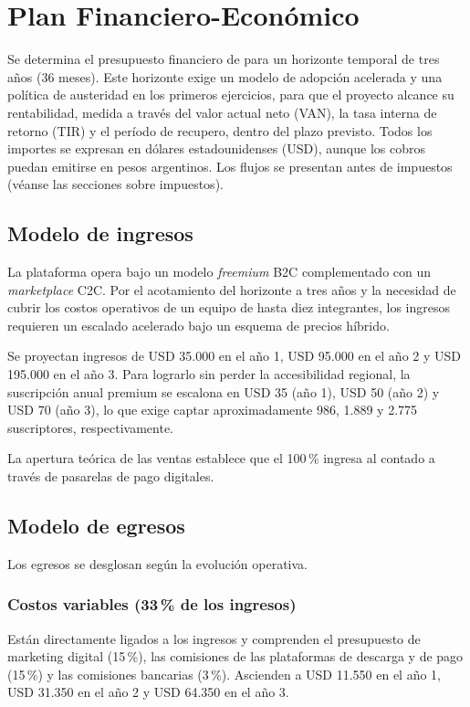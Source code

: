 \capredactadotrue
\section{Plan Financiero-Económico}

Se determina el presupuesto financiero de \nombreproyecto{} para un horizonte temporal de tres años (36 meses). Este horizonte exige un modelo de adopción acelerada y una política de austeridad en los primeros ejercicios, para que el proyecto alcance su rentabilidad, medida a través del valor actual neto (VAN), la tasa interna de retorno (TIR) y el período de recupero, dentro del plazo previsto. Todos los importes se expresan en dólares estadounidenses (USD), aunque los cobros puedan emitirse en pesos argentinos. Los flujos se presentan antes de impuestos (véanse las secciones sobre impuestos).

\subsection{Modelo de ingresos}
La plataforma opera bajo un modelo \textit{freemium} B2C complementado con un \textit{marketplace} C2C. Por el acotamiento del horizonte a tres años y la necesidad de cubrir los costos operativos de un equipo de hasta diez integrantes, los ingresos requieren un escalado acelerado bajo un esquema de precios híbrido.

Se proyectan ingresos de USD 35.000 en el año 1, USD 95.000 en el año 2 y USD 195.000 en el año 3. Para lograrlo sin perder la accesibilidad regional, la suscripción anual premium se escalona en USD 35 (año 1), USD 50 (año 2) y USD 70 (año 3), lo que exige captar aproximadamente 986, 1.889 y 2.775 suscriptores, respectivamente.

La apertura teórica de las ventas establece que el 100\,\% ingresa al contado a través de pasarelas de pago digitales.

\subsection{Modelo de egresos}
Los egresos se desglosan según la evolución operativa.

\subsubsection{Costos variables (33\,\% de los ingresos)}
Están directamente ligados a los ingresos y comprenden el presupuesto de marketing digital (15\,\%), las comisiones de las plataformas de descarga y de pago (15\,\%) y las comisiones bancarias (3\,\%). Ascienden a USD 11.550 en el año 1, USD 31.350 en el año 2 y USD 64.350 en el año 3.

